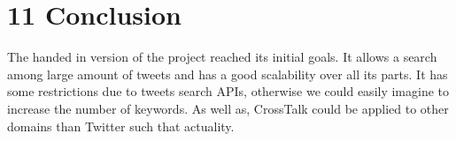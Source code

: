 \chapter*{11    Conclusion}
\setcounter{chapter}{11}
\setcounter{section}{0}

The handed in version of the project reached its initial goals. It allows a search among large amount of tweets and has a good scalability over all its parts. It has some restrictions due to tweets search APIs, otherwise we could easily imagine to increase the number of keywords. As well as, CrossTalk could be applied to other domains than Twitter such that actuality.